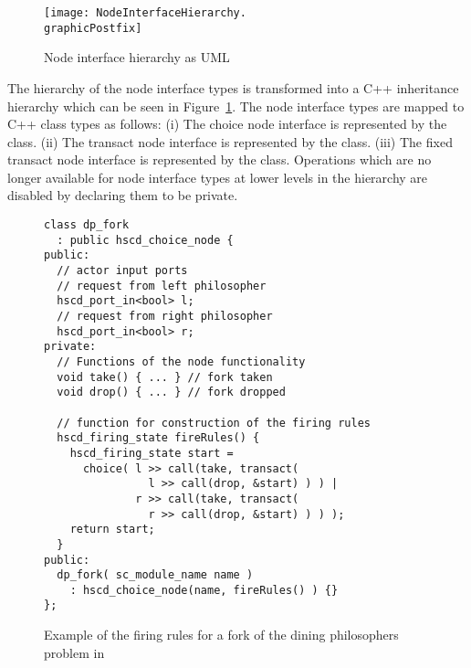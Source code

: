 \begin{figure}[h]
\centering
\texttt{[image: NodeInterfaceHierarchy.\\graphicPostfix]}\\
\caption{\label{node-interface-hierarchy}Node interface hierarchy as UML}
\end{figure}

The hierarchy of the node interface types is transformed into
a C++ inheritance hierarchy which can be seen in Figure~\ref{node-interface-hierarchy}.
The node interface types are mapped to C++ class types as follows:
(i) The choice node interface is represented by the  class.
(ii) The transact node interface is represented by the  class.
(iii) The fixed transact node interface is represented by the  class.
Operations which are no longer available for node interface types
at lower levels in the hierarchy are disabled by declaring them to be private.

\begin{figure}[h]
\centering
\begin{verbatim}
class dp_fork
  : public hscd_choice_node {
public:
  // actor input ports
  // request from left philosopher
  hscd_port_in<bool> l; 
  // request from right philosopher
  hscd_port_in<bool> r; 
private:
  // Functions of the node functionality
  void take() { ... } // fork taken
  void drop() { ... } // fork dropped
  
  // function for construction of the firing rules
  hscd_firing_state fireRules() {
    hscd_firing_state start =
      choice( l >> call(take, transact(
                l >> call(drop, &start) ) ) |
              r >> call(take, transact(
                r >> call(drop, &start) ) ) );
    return start;
  }
public:
  dp_fork( sc_module_name name )
    : hscd_choice_node(name, fireRules() ) {}
};
\end{verbatim}


\caption{\label{systemoc-firing-rules-example}
  Example of the firing rules for a fork of the
  dining philosophers problem in \SysteMoC{}}
\end{figure}

